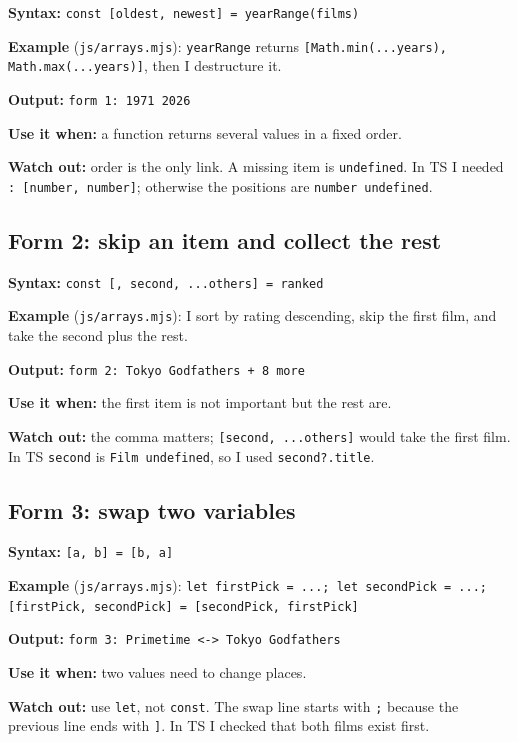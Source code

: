 \documentclass[
  11pt,
]{article}
\begin{document}
\textbf{Syntax:}
\texttt{const [oldest, newest] = yearRange(films)}

\textbf{Example} (\texttt{js/arrays.mjs}):
\texttt{yearRange} returns
\texttt{[Math.min(...years), Math.max(...years)]}, then
I destructure it.

\textbf{Output:} \texttt{form 1: 1971 2026}

\textbf{Use it when:} a function returns several values in a fixed
order.

\textbf{Watch out:} order is the only link. A missing item is
\texttt{undefined}. In TS I needed
\texttt{: [number, number]}; otherwise the positions
are \texttt{number \textbar{} undefined}.

\subsection{Form 2: skip an item and collect the
rest}\label{form-2-skip-an-item-and-collect-the-rest}

\textbf{Syntax:}
\texttt{const [, second, ...others] = ranked}

\textbf{Example} (\texttt{js/arrays.mjs}): I sort by
rating descending, skip the first film, and take the second plus the
rest.

\textbf{Output:}
\texttt{form 2: Tokyo Godfathers + 8 more}

\textbf{Use it when:} the first item is not important but the rest are.

\textbf{Watch out:} the comma matters;
\texttt{[second, ...others]} would take the first film.
In TS \texttt{second} is
\texttt{Film \textbar{} undefined}, so I used
\texttt{second?.title}.

\subsection{Form 3: swap two variables}\label{form-3-swap-two-variables}

\textbf{Syntax:} \texttt{[a, b] = [b, a]}

\textbf{Example} (\texttt{js/arrays.mjs}):
\texttt{let firstPick = ...; let secondPick = ...; [firstPick, secondPick] = [secondPick, firstPick]}

\textbf{Output:}
\texttt{form 3: Primetime \textless{}-\textgreater{} Tokyo Godfathers}

\textbf{Use it when:} two values need to change places.

\textbf{Watch out:} use \texttt{let}, not
\texttt{const}. The swap line starts with
\texttt{;} because the previous line ends with
\texttt{]}. In TS I checked that both films exist
first.
\end{document}
